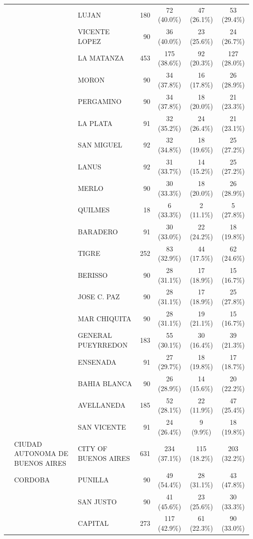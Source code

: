\begin{landscape}
\begin{longtable}{p{2.2cm}p{3.0cm}p{4.0cm}rccc}
 &  & LUJAN & 180 & 72 (40.0\%) & 47 (26.1\%) & 53 (29.4\%) \\
 &  & VICENTE LOPEZ & 90 & 36 (40.0\%) & 23 (25.6\%) & 24 (26.7\%) \\
 &  & LA MATANZA & 453 & 175 (38.6\%) & 92 (20.3\%) & 127 (28.0\%) \\
 &  & MORON & 90 & 34 (37.8\%) & 16 (17.8\%) & 26 (28.9\%) \\
 &  & PERGAMINO & 90 & 34 (37.8\%) & 18 (20.0\%) & 21 (23.3\%) \\
 &  & LA PLATA & 91 & 32 (35.2\%) & 24 (26.4\%) & 21 (23.1\%) \\
 &  & SAN MIGUEL & 92 & 32 (34.8\%) & 18 (19.6\%) & 25 (27.2\%) \\
 &  & LANUS & 92 & 31 (33.7\%) & 14 (15.2\%) & 25 (27.2\%) \\
 &  & MERLO & 90 & 30 (33.3\%) & 18 (20.0\%) & 26 (28.9\%) \\
 &  & QUILMES & 18 & 6 (33.3\%) & 2 (11.1\%) & 5 (27.8\%) \\
 &  & BARADERO & 91 & 30 (33.0\%) & 22 (24.2\%) & 18 (19.8\%) \\
 &  & TIGRE & 252 & 83 (32.9\%) & 44 (17.5\%) & 62 (24.6\%) \\
 &  & BERISSO & 90 & 28 (31.1\%) & 17 (18.9\%) & 15 (16.7\%) \\
 &  & JOSE C. PAZ & 90 & 28 (31.1\%) & 17 (18.9\%) & 25 (27.8\%) \\
 &  & MAR CHIQUITA & 90 & 28 (31.1\%) & 19 (21.1\%) & 15 (16.7\%) \\
 &  & GENERAL PUEYRREDON & 183 & 55 (30.1\%) & 30 (16.4\%) & 39 (21.3\%) \\
 &  & ENSENADA & 91 & 27 (29.7\%) & 18 (19.8\%) & 17 (18.7\%) \\
 &  & BAHIA BLANCA & 90 & 26 (28.9\%) & 14 (15.6\%) & 20 (22.2\%) \\
 &  & AVELLANEDA & 185 & 52 (28.1\%) & 22 (11.9\%) & 47 (25.4\%) \\
 &  & SAN VICENTE & 91 & 24 (26.4\%) & 9 (9.9\%) & 18 (19.8\%) \\
\addlinespace[2pt]
 & CIUDAD AUTONOMA DE BUENOS AIRES & CITY OF BUENOS AIRES & 631 & 234 (37.1\%) & 115 (18.2\%) & 203 (32.2\%) \\
\addlinespace[2pt]
 & CORDOBA & PUNILLA & 90 & 49 (54.4\%) & 28 (31.1\%) & 43 (47.8\%) \\
 &  & SAN JUSTO & 90 & 41 (45.6\%) & 23 (25.6\%) & 30 (33.3\%) \\
 &  & CAPITAL & 273 & 117 (42.9\%) & 61 (22.3\%) & 90 (33.0\%) \\

\end{longtable}
\end{landscape}
